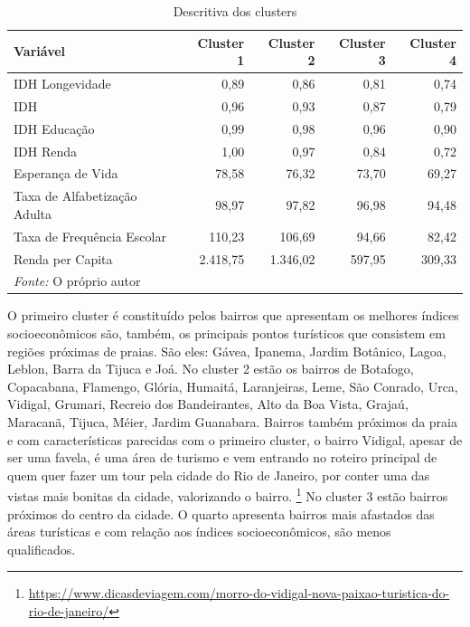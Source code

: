 \documentclass[
	12pt,				%
	a4paper,		%
	oneside,    %
	chapter=TITLE,		   %
	section=TITLE,		   %
	subsection=TITLE,	   %
	subsubsection=TITLE, %
	english,			%
	french,				%
	spanish,			%
	brazil,				%
]{abntex2}
\begin{document}
\begin{table}

\caption{\label{tab:descritiva_cluster}Descritiva dos clusters}
\centering
\begin{tabular}[t]{l|r|r|r|r}
\hline
Variável & Cluster 1 & Cluster 2 & Cluster 3 & Cluster 4\\
\hline
IDH Longevidade & 0,89 & 0,86 & 0,81 & 0,74\\
\hline
IDH & 0,96 & 0,93 & 0,87 & 0,79\\
\hline
IDH Educação & 0,99 & 0,98 & 0,96 & 0,90\\
\hline
IDH Renda & 1,00 & 0,97 & 0,84 & 0,72\\
\hline
Esperança de Vida & 78,58 & 76,32 & 73,70 & 69,27\\
\hline
Taxa de Alfabetização Adulta & 98,97 & 97,82 & 96,98 & 94,48\\
\hline
Taxa de Frequência Escolar & 110,23 & 106,69 & 94,66 & 82,42\\
\hline
Renda per Capita & 2.418,75 & 1.346,02 & 597,95 & 309,33\\
\hline
\multicolumn{5}{l}{\textit{Fonte: } O próprio autor}\\
\end{tabular}
\end{table}

O primeiro cluster é constituído pelos bairros que apresentam os
melhores índices socioeconômicos são, também, os principais pontos
turísticos que consistem em regiões próximas de praias. São eles: Gávea,
Ipanema, Jardim Botânico, Lagoa, Leblon, Barra da Tijuca e Joá. No
cluster 2 estão os bairros de Botafogo, Copacabana, Flamengo, Glória,
Humaitá, Laranjeiras, Leme, São Conrado, Urca, Vidigal, Grumari, Recreio
dos Bandeirantes, Alto da Boa Vista, Grajaú, Maracanã, Tijuca, Méier,
Jardim Guanabara. Bairros também próximos da praia e com características
parecidas com o primeiro cluster, o bairro Vidigal, apesar de ser uma
favela, é uma área de turismo e vem entrando no roteiro principal de
quem quer fazer um tour pela cidade do Rio de Janeiro, por conter uma
das vistas mais bonitas da cidade, valorizando o bairro.
\footnote{\url{https://www.dicasdeviagem.com/morro-do-vidigal-nova-paixao-turistica-do-rio-de-janeiro/}}
No cluster 3 estão bairros próximos do centro da cidade. O quarto
apresenta bairros mais afastados das áreas turísticas e com relação aos
índices socioeconômicos, são menos qualificados.
\end{document}
